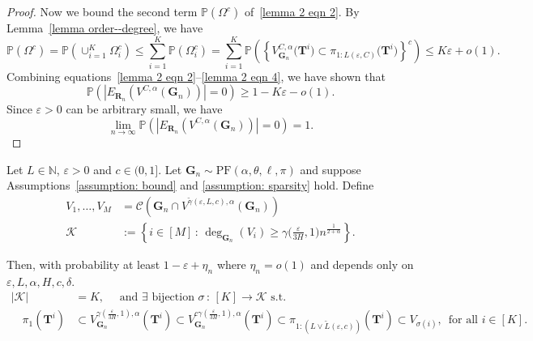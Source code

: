 \documentclass[twoside,11pt]{article}
\theoremstyle{remark}
\begin{document}
\begin{proof}
Now we bound the second term $\mathbb{P}\left(\Omega^c\right)$ of~\eqref{lemma 2 eqn 2}. 
By Lemma~\ref{lemma order--degree}, we have
%
\begin{equation}
\label{lemma 2 eqn 4}
\mathbb{P}\left(\Omega^c\right)=\mathbb{P}\left(\cup_{i=1}^K \Omega_i^c\right)\le \sum_{i=1}^K \mathbb{P}\left(\Omega_i^c\right)= \sum_{i=1}^K \mathbb{P}\left(\left\{ V^{C,\alpha}_{\boldsymbol{G}_n}\bigl(\boldsymbol{T}^i\bigr)\subset\pi_{1:{L\left(\varepsilon, C\right)}}\bigl(\boldsymbol{T}^i\bigr)\right\}^c\right) \leq K\varepsilon + o(1).
\end{equation}
%
Combining equations~\eqref{lemma 2 eqn 2}–\eqref{lemma 2 eqn 4}, we have shown that
\begin{equation*}  \mathbb{P}\left(\left|E_{\boldsymbol{R}_n}\left(V^{C,\alpha}\left(\boldsymbol{G}_n\right)\right)\right|=0\right)\geq 1-K\varepsilon-o(1).
\end{equation*}
%
Since $\varepsilon>0$ can be arbitrary small, we have 
%
\begin{equation*}
     \lim_{n \rightarrow \infty} \mathbb{P}\left(\left|E_{\boldsymbol{R}_n}\left(V^{C,\alpha}\left(\boldsymbol{G}_n\right)\right)\right|=0\right)=1.
\end{equation*}
%
\end{proof}

\begin{lemma}
\label{lemma early hist containment}

Let $L \in \mathbb{N}$, $\varepsilon > 0$ and $c\in (0,1]$. Let $\bm{G}_n \sim \mathrm{PF}(\alpha, \theta, \ell, \pi)$ and suppose Assumptions~\ref{assumption: bound} and \ref{assumption: sparsity} hold. Define
\begin{align*}
V_1, \ldots, V_M &= \mathcal{C}(\bm{G}_n \cap V^{\tilde{\gamma}(\varepsilon, L,c), \alpha}(\bm{G}_n))\\
\mathcal{K} &:= \left\{ i \in [M] \,: \, \operatorname{deg}_{\boldsymbol{G}_n}(V_i) \ge \gamma\biggl( \frac{\varepsilon}{3H}, 1 \biggr) n^{\frac{1}{2+\alpha}} \right\}.
\end{align*}

Then, with probability at least $1 - \varepsilon + \eta_n$ where $\eta_n = o(1)$ and depends only on $\varepsilon, L, \alpha, H, c, \delta$.
\begingroup
\begin{align}
|\mathcal{K}| &= K,\quad  \text{ and } \nonumber
\exists \text{ bijection } \sigma \,:\, [K]  \rightarrow \mathcal{K} \text{ s.t.}\\
\quad \pi_1(\bm{T}^i) &\subset V^{\gamma( \frac{\varepsilon}{3H}, 1 ), \alpha}_{\bm{G}_n}(\bm{T}^i)
\subset V^{c\gamma(\frac{\varepsilon}{3H}, 1 ), \alpha}_{\bm{G}_n}(\bm{T}^i)
\subset \pi_{1:(L \vee \tilde{L}(\varepsilon,c))}( \bm{T}^{i}) \subset V_{\sigma(i)},\, \text{ for all $i \in [K]$}. \label{prop 2 eqn 1}
\end{align}
\endgroup

\end{lemma}
\end{document}
